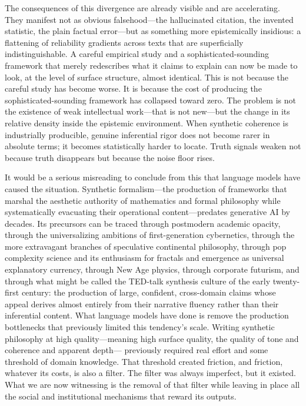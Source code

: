 \documentclass[12pt, openright, twoside]{book}
\begin{document}
The consequences of this divergence are already visible and are accelerating. They
manifest not as obvious falsehood---the hallucinated citation, the invented
statistic, the plain factual error---but as something more epistemically insidious:
a flattening of reliability gradients across texts that are superficially
indistinguishable. A careful empirical study and a sophisticated-sounding framework
that merely redescribes what it claims to explain can now be made to look, at the
level of surface structure, almost identical. This is not because the careful study
has become worse. It is because the cost of producing the sophisticated-sounding
framework has collapsed toward zero. The problem is not the existence of weak
intellectual work---that is not new---but the change in its relative density inside
the epistemic environment. When synthetic coherence is industrially producible,
genuine inferential rigor does not become rarer in absolute terms; it becomes
statistically harder to locate. Truth signals weaken not because truth disappears
but because the noise floor rises.

It would be a serious misreading to conclude from this that language models have
caused the situation. Synthetic formalism---the production of frameworks that
marshal the aesthetic authority of mathematics and formal philosophy while
systematically evacuating their operational content---predates generative AI by
decades. Its precursors can be traced through postmodern academic opacity, through
the universalizing ambitions of first-generation cybernetics, through the more
extravagant branches of speculative continental philosophy, through pop complexity
science and its enthusiasm for fractals and emergence as universal explanatory
currency, through New Age physics, through corporate futurism, and through what
might be called the TED-talk synthesis culture of the early twenty-first century:
the production of large, confident, cross-domain claims whose appeal derives almost
entirely from their narrative fluency rather than their inferential content.
What language models have done is remove the production bottlenecks that previously
limited this tendency's scale. Writing synthetic philosophy at high quality---meaning
high surface quality, the quality of tone and coherence and apparent depth---
previously required real effort and some threshold of domain knowledge. That
threshold created friction, and friction, whatever its costs, is also a filter.
The filter was always imperfect, but it existed. What we are now witnessing is the
removal of that filter while leaving in place all the social and institutional
mechanisms that reward its outputs.
\end{document}

